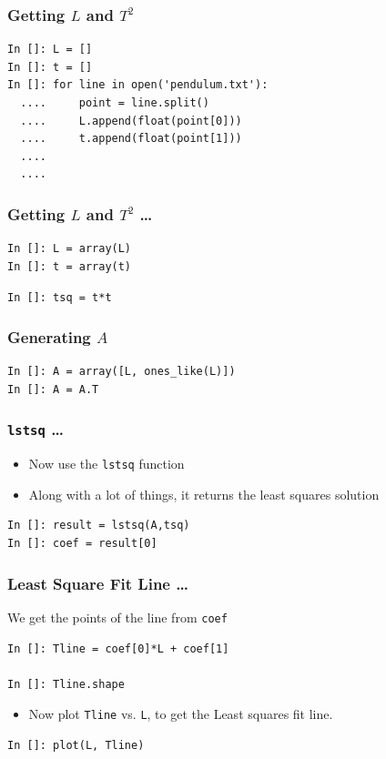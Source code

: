 \documentclass[14pt,compress]{beamer}
\newcommand{\typ}[1]{\lstinline{#1}}
\begin{document}
\begin{frame}[fragile]
\frametitle{Getting $L$ and $T^2$}
\begin{lstlisting}
In []: L = []
In []: t = []
In []: for line in open('pendulum.txt'):
  ....     point = line.split()
  ....     L.append(float(point[0]))
  ....     t.append(float(point[1]))
  ....
  ....
\end{lstlisting}
\end{frame}

\begin{frame}[fragile]
\frametitle{Getting $L$ and $T^2$ \dots}
\begin{lstlisting}
In []: L = array(L)
In []: t = array(t)
\end{lstlisting}
\alert{\typ{In []: tsq = t*t}}
\end{frame}
 
\begin{frame}[fragile]
\frametitle{Generating $A$}
\begin{lstlisting}
In []: A = array([L, ones_like(L)])
In []: A = A.T
\end{lstlisting}
\end{frame}

\begin{frame}[fragile]
\frametitle{\typ{lstsq} \ldots}
\begin{itemize}
\item Now use the \typ{lstsq} function
\item Along with a lot of things, it returns the least squares solution
\end{itemize}
\begin{lstlisting}
In []: result = lstsq(A,tsq)
In []: coef = result[0]
\end{lstlisting}
\end{frame}

\begin{frame}[fragile]
\frametitle{Least Square Fit Line \ldots}
We get the points of the line from \typ{coef}
\begin{lstlisting}
In []: Tline = coef[0]*L + coef[1]

In []: Tline.shape
\end{lstlisting}
\begin{itemize}
\item Now plot \typ{Tline} vs. \typ{L}, to get the Least squares fit line. 
\end{itemize}
\begin{lstlisting}
In []: plot(L, Tline)
\end{lstlisting}
\end{frame}
\end{document}
